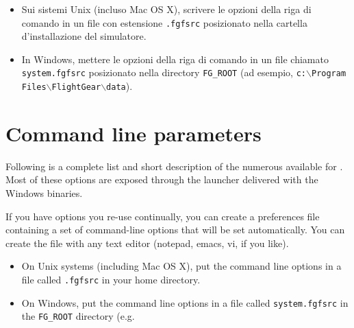 \begin{itemize}
{  \begin{itemize}
  \item Sui sistemi Unix (incluso Mac OS X), scrivere le opzioni della riga di comando in
  un file con estensione \texttt{.fgfsrc} posizionato nella cartella d'installazione
  del simulatore.

  \item In Windows, mettere le opzioni della riga di comando in un file chiamato
  \texttt{system.fgfsrc}
   posizionato nella directory \texttt{FG\_ROOT}
  (ad esempio, \texttt{c:$\backslash$Program Files$\backslash$FlightGear$\backslash$data}).
  \end{itemize}

}
{

  \section{Command line parameters\label{options}}
  Following is a complete list and short description of the numerous 
  available for \FlightGear{}. Most of these options are exposed through the \FlightGear{} launcher delivered with the
  Windows binaries.

  If you have options you re-use continually, you can create a preferences file
  containing a set of command-line options that will be set automatically. You
  can create the file with any text editor (notepad, emacs, vi, if you like).

  \begin{itemize}
  \item On Unix systems (including Mac OS X), put the command line options in a
  file called \texttt{.fgfsrc} in your home directory.

  \item On Windows, put the command line options in a file called \texttt{system.fgfsrc}
   in the \texttt{FG\_ROOT} directory (e.g.
  \end{itemize}
}


\end{itemize}
